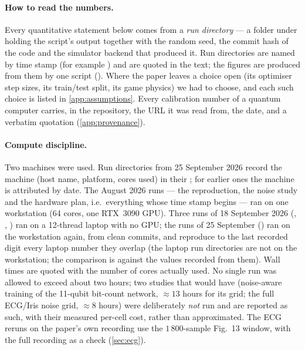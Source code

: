 \paragraph{How to read the numbers.}
Every quantitative statement below comes from a \emph{run directory} --- a folder under
 holding the script's output together with the random seed, the commit
hash of the code and the simulator backend that produced it.  Run directories are named by
time stamp (for example ) and are quoted in the text; the
figures are produced from them by one script ().  Where the
paper leaves a choice open (its optimiser step sizes, its train/test split, its game physics) we
had to choose, and each such choice is listed in \cref{app:assumptions}.  Every calibration
number of a quantum computer carries, in the repository, the URL it was read from, the date, and
a verbatim quotation (\cref{app:provenance}).

\paragraph{Compute discipline.}
Two machines were used.  Run directories from 25 September 2026 record the machine (host name,
platform, cores used) in their ; for earlier ones the machine is attributed by
date.  The August 2026 runs --- the
reproduction, the noise study and the hardware plan, i.e.\ everything whose time stamp begins
 --- ran on one workstation (64 cores, one RTX~3090 GPU).  Three runs of
18 September 2026 (, ,
) ran on a 12-thread laptop with no GPU; the runs of
25 September () ran on the workstation again, from clean commits, and reproduce
to the last recorded digit every laptop number they overlap (the laptop run directories are not
on the workstation; the comparison is against the values recorded from them).  Wall times are quoted with the number of cores
actually used.  No single run was allowed to exceed about two
hours; two studies that would have (noise-aware training of the 11-qubit bit-count network,
$\approx 13$ hours for its grid; the full ECG/Iris noise grid, $\approx 8$ hours) were
deliberately \emph{not} run and are reported as such, with their measured per-cell cost, rather
than approximated.  The ECG reruns on the paper's own recording use the $1\,800$-sample
Fig.~13 window, with the full recording as a check (\cref{sec:ecg}).

